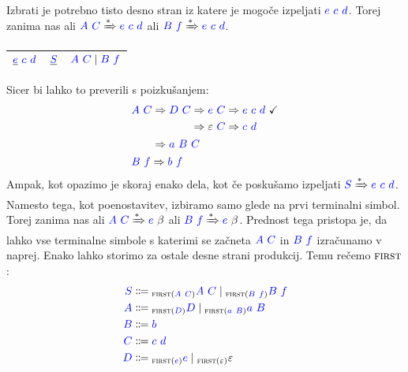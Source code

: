 \documentclass{article}
\newcommand{\FIRST}{\textsc{first}}
\newcommand{\OK}{\ \checkmark}
\newcommand{\Symbol}[1]{\textcolor{blue}{#1}}
\newcommand{\Null}{\varepsilon}
\newcommand{\Arrow}{\Coloneq}
\newcommand{\Derive}{\Rightarrow}
\newcommand{\DeriveStar}{\xRightarrow{\ast}}
\newcommand{\Seq}{\ }
\newcommand{\Union}{\mathrel{|}}
\newcommand{\Lk}[1]{{}_{{#1}}}
\begin{document}
Izbrati je potrebno tisto desno stran iz katere je mogoče izpeljati $\Symbol{e} \Seq \Symbol{c} \Seq \Symbol{d}$.
Torej zanima nas ali $\Symbol{A} \Seq \Symbol{C} \DeriveStar \Symbol{e} \Seq \Symbol{c} \Seq \Symbol{d}$ ali $\Symbol{B} \Seq \Symbol{f} \DeriveStar \Symbol{e} \Seq \Symbol{c} \Seq \Symbol{d}$.
\begin{center}
\begin{tabular}{|c|c|c|}
  \hline
  $\underline{\Symbol{e}} \Seq \Symbol{c} \Seq \Symbol{d}$ & $\underline{\Symbol{S}}$ & $\Symbol{A} \Seq \Symbol{C} \Union \Symbol{B} \Seq \Symbol{f}$ \\ 
  \hline
\end{tabular}
\end{center}
Sicer bi lahko to preverili s poizkušanjem:
\begin{equation*}
  \begin{aligned}[t]
    &\Symbol{A} \Seq \Symbol{C} \begin{aligned}[t]
      &\Derive \Symbol{D} \Seq \Symbol{C} \begin{aligned}[t]
        &\Derive \Symbol{e} \Seq \Symbol{C} \Derive \Symbol{e} \Seq \Symbol{c} \Seq \Symbol{d} \OK\\
        &\Derive \Null \Seq \Symbol{C} \Derive \Symbol{c} \Seq \Symbol{d}
      \end{aligned}\\
      &\Derive \Symbol{a} \Seq \Symbol{B} \Seq \Symbol{C}
    \end{aligned}\\
    &\Symbol{B} \Seq \Symbol{f} \Derive \Symbol{b} \Seq \Symbol{f}
  \end{aligned}
\end{equation*}
Ampak, kot opazimo je skoraj enako dela, kot če poskušamo izpeljati $\Symbol{S} \DeriveStar \Symbol{e} \Seq \Symbol{c} \Seq \Symbol{d}$.
Namesto tega, kot poenostavitev, izbiramo samo glede na prvi terminalni simbol.
Torej zanima nas ali $\Symbol{A} \Seq \Symbol{C} \DeriveStar \Symbol{e} \Seq \beta$ ali $\Symbol{B} \Seq \Symbol{f} \DeriveStar \Symbol{e} \Seq \beta$.
Prednost tega pristopa je, da lahko vse terminalne simbole s katerimi se začneta $\Symbol{A} \Seq \Symbol{C}$ in $\Symbol{B} \Seq \Symbol{f}$ izračunamo v naprej.
Enako lahko storimo za ostale desne strani produkcij.
Temu rečemo $\FIRST$:
\begin{equation*}
  \begin{aligned}
    \Symbol{S} &\Arrow \Lk{\FIRST(\Symbol{A} \Seq \Symbol{C})} \Symbol{A} \Seq \Symbol{C} \Union \Lk{\FIRST(\Symbol{B} \Seq \Symbol{f})} \Symbol{B} \Seq \Symbol{f} \\
    \Symbol{A} &\Arrow \Lk{\FIRST(\Symbol{D})} \Symbol{D} \Union \Lk{\FIRST(\Symbol{a} \Seq \Symbol{B})} \Symbol{a} \Seq \Symbol{B} \\
    \Symbol{B} &\Arrow \Symbol{b}\\
    \Symbol{C} &\Arrow \Symbol{c} \Seq \Symbol{d}\\
    \Symbol{D} &\Arrow \Lk{\FIRST(\Symbol{e})} \Symbol{e} \Union \Lk{\FIRST(\Null)} \Null
  \end{aligned}
\end{equation*}
\end{document}
